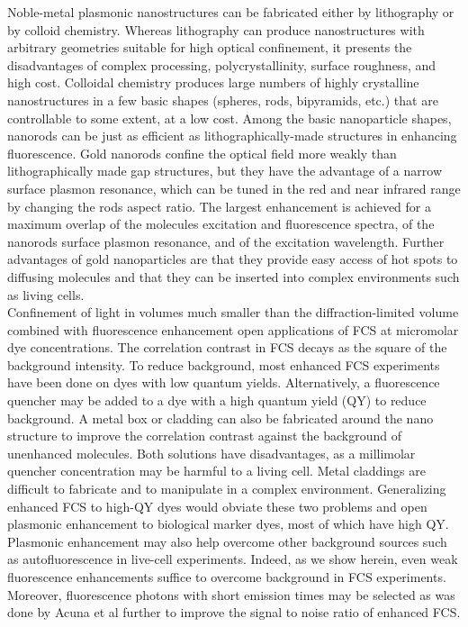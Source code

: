 \documentclass[journal=jpccck,manuscript=article]{achemso}
\begin{document}
Noble-metal plasmonic nanostructures can be fabricated either by lithography or by colloid 
chemistry.\cite{zijlstra2011single} Whereas lithography can produce nanostructures with arbitrary geometries suitable 
for high optical confinement, it presents the disadvantages of complex processing, polycrystallinity, surface 
roughness, and high cost. Colloidal chemistry produces large numbers of highly crystalline nanostructures in a 
few basic shapes (spheres, rods, bipyramids, etc.) that are controllable to some extent, at a low cost. 
Among the basic nanoparticle shapes, nanorods\cite{yuan2013thousandfold} can be just as efficient as 
lithographically-made structures\cite{punj2013a,kinkhabwala2009large} in enhancing fluorescence. Gold nanorods confine 
the optical field more weakly than lithographically made gap structures, but they have the advantage of a narrow 
surface plasmon resonance, which can be tuned in the red and near infrared range by changing the rod\textquotesingle s 
aspect ratio.\cite{khatua2014resonant} The largest enhancement is achieved for a maximum overlap of the 
molecule\textquotesingle s excitation and fluorescence spectra, of the nanorod\textquotesingle s surface plasmon 
resonance, and of the excitation wavelength. Further advantages of gold nanoparticles are that they provide easy access 
of hot spots to diffusing molecules and that they can be inserted into complex environments such as living cells.\\

Confinement of light in volumes much smaller than the diffraction-limited volume combined with fluorescence enhancement 
open applications of FCS at micromolar dye concentrations. The correlation contrast in FCS decays as the square of the 
background intensity. To reduce background, most enhanced FCS experiments have been done on dyes with low quantum 
yields.\cite{kinkhabwala2012fluorescence,estrada200810000} Alternatively, a fluorescence quencher may be added to a 
dye with a high quantum yield (QY) to reduce background.\cite{punj2013a,punj2013gold} A metal box or 
cladding\cite{ghenuche2015matching} can also be fabricated around the nano structure to improve the correlation 
contrast against the background of unenhanced molecules. Both solutions have disadvantages, as a millimolar 
quencher concentration may be harmful to a living cell. Metal claddings are difficult to fabricate and to manipulate 
in a complex environment. Generalizing enhanced FCS to high-QY dyes would obviate these two problems and open 
plasmonic enhancement to biological marker dyes, most of which have high QY. Plasmonic enhancement may also help 
overcome other background sources such as autofluorescence in live-cell experiments. Indeed, as we show herein, 
even weak fluorescence enhancements suffice to overcome background in FCS experiments. Moreover, fluorescence photons 
with short emission times may be selected as was done by Acuna et al\cite{acuna2012fluorescence} further to improve 
the signal to noise ratio of enhanced FCS.\\
\end{document}
